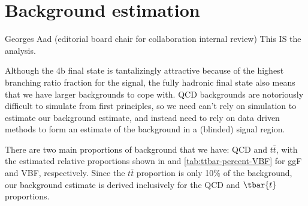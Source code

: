 \chapter{Background estimation}
\label{ch:bkg-est}

\begin{chapquote}{Georges Aad (editorial board chair for collaboration internal review)}
{This IS the analysis.}
\end{chapquote}

Although the 4b final state is tantalizingly attractive because of the highest branching ratio fraction for the signal,  the fully hadronic final state also means that we have larger backgrounds to cope with. QCD backgrounds are notoriously difficult to simulate from first principles, so we need can't rely on simulation to estimate our background estimate, and instead need to rely on data driven methods to form an estimate of the background in a (blinded) signal region.


There are two main proportions of background that we have: QCD and $t\bar{t}$, with the estimated relative proportions shown in \Tab{\ref{tab:ttbar-percent-ggF-4b}} and \ref{tab:ttbar-percent-VBF} for ggF and VBF, respectively. Since the $t\bar{t}$ proportion is only 10\% of the background, our background estimate is derived inclusively for the QCD and $\tbar{t}$ proportions.

\begin{table}[h]
	\centering
	\caption{Percentage of the data-driven background estimate expected to be composed of \ttbar events for the ggF 4b (left) and VBF 4b categories (right).}
	\label{tab:ttbar-proportion}
\end{table}


